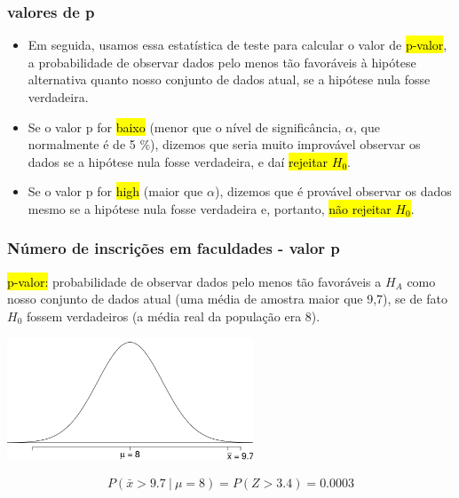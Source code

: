 \documentclass[11pt]{beamer}
\begin{document}

\begin{frame}
\frametitle{valores de p}

\begin{itemize}

\item Em seguida, usamos essa estatística de teste para calcular o valor de \hl {p-valor}, a probabilidade de observar dados pelo menos tão favoráveis à hipótese alternativa quanto nosso conjunto de dados atual, se a hipótese nula fosse verdadeira.


\pause

\item Se o valor p for \hl {baixo} (menor que o nível de significância, $ \alpha $, que normalmente é de 5 \%), dizemos que seria muito improvável observar os dados se a hipótese nula fosse verdadeira, e daí \hl {rejeitar $ H_0 $}.

\pause

\item Se o valor p for \hl {high} (maior que $ \alpha $), dizemos que é provável observar os dados mesmo se a hipótese nula fosse verdadeira e, portanto, \hl {não rejeitar $ H_0 $}.

\end{itemize}

\end{frame}


\begin{frame}
\frametitle{Número de inscrições em faculdades - valor p}

\hl{p-valor:} probabilidade de observar dados pelo menos tão favoráveis a $ H_A $ como nosso conjunto de dados atual (uma média de amostra maior que 9,7), se de fato $ H_0 $ fossem verdadeiros (a média real da população era 8).


\begin{center}
\includegraphics[width=0.55\textwidth]{app_pval_gr.pdf}
\end{center}

\pause

\[ P(\bar{x} > 9.7~|~\mu = 8) = P(Z > 3.4) = 0.0003 \]

\end{frame}
\end{document}
